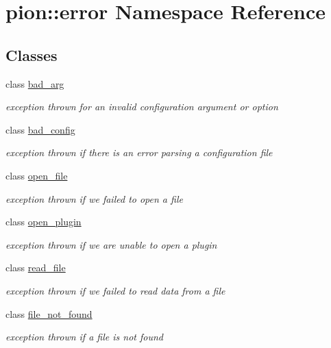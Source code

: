 \hypertarget{namespacepion_1_1error}{\section{pion\-:\-:error Namespace Reference}
\label{namespacepion_1_1error}
}
\subsection*{Classes}
\begin{DoxyCompactItemize}
\item 
class \hyperlink{classpion_1_1error_1_1bad__arg}{bad\-\_\-arg}
\begin{DoxyCompactList}\small\item\em exception thrown for an invalid configuration argument or option \end{DoxyCompactList}\item 
class \hyperlink{classpion_1_1error_1_1bad__config}{bad\-\_\-config}
\begin{DoxyCompactList}\small\item\em exception thrown if there is an error parsing a configuration file \end{DoxyCompactList}\item 
class \hyperlink{classpion_1_1error_1_1open__file}{open\-\_\-file}
\begin{DoxyCompactList}\small\item\em exception thrown if we failed to open a file \end{DoxyCompactList}\item 
class \hyperlink{classpion_1_1error_1_1open__plugin}{open\-\_\-plugin}
\begin{DoxyCompactList}\small\item\em exception thrown if we are unable to open a plugin \end{DoxyCompactList}\item 
class \hyperlink{classpion_1_1error_1_1read__file}{read\-\_\-file}
\begin{DoxyCompactList}\small\item\em exception thrown if we failed to read data from a file \end{DoxyCompactList}\item 
class \hyperlink{classpion_1_1error_1_1file__not__found}{file\-\_\-not\-\_\-found}
\begin{DoxyCompactList}\small\item\em exception thrown if a file is not found \end{DoxyCompactList}\item 

\end{DoxyCompactItemize}
